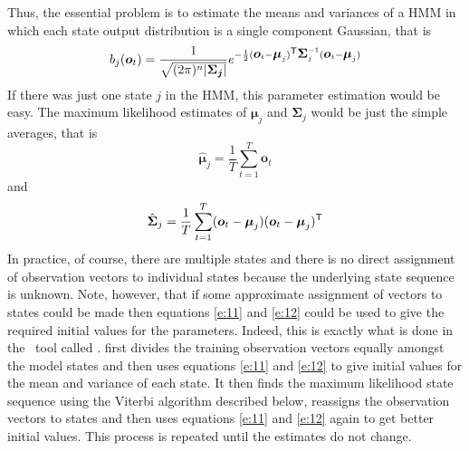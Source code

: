 
Thus, the essential problem is to estimate the means and 
variances of a HMM in which each state output distribution is a single
component Gaussian, that is
\begin{equation} \label{e:10}
b_j({\mbox{\boldmath $o$}}_t) = \frac{1}{\sqrt{(2 \pi)^n | {\mbox{\boldmath $\Sigma_j$}} |}} 
      e^{- \frac{1}{2}({\mbox{\boldmath $o$}}_t - {\mbox{\boldmath $\mu$}}_j)^{\scriptstyle\sf T}{\mbox{\boldmath $\Sigma$}}_j^{-1}({\mbox{\boldmath $o$}}_t - {\mbox{\boldmath $\mu$}}_j)}
\end{equation}
If there was just one state $j$ in the HMM, this parameter
estimation would be easy.  The maximum likelihood estimates of 
$\bm{\mu}_j$ and $\bm{\Sigma}_j$ would be just the simple averages, 
that is
\begin{equation} \label{e:11}
   \hat{\bm{\mu}}_j = \frac{1}{T} \sum_{t=1}^{T} \bm{o}_t
\end{equation}
and
\begin{equation} \label{e:12}
   \hat{{\mbox{\boldmath $\Sigma$}}}_j = \frac{1}{T} \sum_{t=1}^{T} 
        ({\mbox{\boldmath $o$}}_t - {\mbox{\boldmath $\mu$}}_j) ({\mbox{\boldmath $o$}}_t - {\mbox{\boldmath $\mu$}}_j)^{\scriptstyle\sf T}
\end{equation}
In practice, of course, there are multiple states and there is no
direct assignment of observation vectors to individual states 
because the underlying state sequence is unknown.  Note, however,
that if some approximate assignment of vectors to states could be made then
equations \ref{e:11} and \ref{e:12} could be used to give the
required initial values for the parameters.  Indeed, this is exactly
what is done in the \HTK\ tool called .  
 first divides the
training observation vectors equally amongst the model states and then
uses equations \ref{e:11} and \ref{e:12} to give initial values for
the mean and variance of each state.  It then finds the maximum
likelihood state sequence using the Viterbi 
algorithm described  below,
reassigns the observation vectors to states and then uses
equations \ref{e:11} and \ref{e:12} again to get better initial 
values.  This process is repeated until the estimates
do not change.

